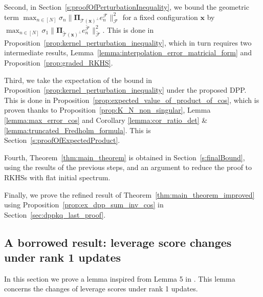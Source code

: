 \documentclass[twoside,11pt]{book}
\numberwithin{theorem}{chapter}
\numberwithin{definition}{chapter}
\numberwithin{proposition}{chapter}
\numberwithin{corollary}{chapter}
\numberwithin{example}{chapter}
\numberwithin{lemma}{chapter}
\numberwithin{assumption}{chapter}
\numberwithin{equation}{chapter}
\numberwithin{figure}{chapter}
\begin{document}

Second, in Section~\ref{s:proofOfPerturbationInequality}, we bound the geometric term $\max_{n \in [N]} \sigma_{n} \|\bm{\Pi}_{\mathcal{T}(\bm{x})^{\perp}} e_{n}^{\mathcal{F}}\|_{\mathcal{F}}^{2}$ for a fixed configuration $\bm{x}$ by $\max_{n \in [N]} \sigma_{1} \|\bm{\Pi}_{\tilde{\mathcal{T}}(\bm{x})^{\perp}} e_{n}^{\tilde{\mathcal{F}}}\|_{\tilde{\mathcal{F}}}^{2}$. This is done in Proposition~\ref{prop:kernel_perturbation_inequality}, which in turn requires two intermediate results, Lemma~\ref{lemma:interpolation_error_matricial_form} and Proposition~\ref{prop:graded_RKHS}.


Third, we take the expectation of the bound in Proposition~\ref{prop:kernel_perturbation_inequality} under the proposed DPP. This is done in Proposition~\ref{prop:expected_value_of_product_of_cos}, which is proven thanks to Proposition~\ref{prop:K_N_non_singular}, Lemma \ref{lemma:max_error_cos} and Corollary \ref{lemma:cor_ratio_det} \& \ref{lemma:truncated_Fredholm_formula}. This is Section~\ref{s:proofOfExpectedProduct}.



Fourth, Theorem~\ref{thm:main_theorem} is obtained in Section~\ref{s:finalBound}, using the results of the previous steps, and an argument to reduce the proof to RKHSs with flat initial spectrum.

Finally, we prove the refined result of Theorem~\ref{thm:main_theorem_improved} using Proposition~\ref{prop:ex_dpp_sum_inv_cos} in Section~\ref{sec:dppkq_last_proof}.  


\subsection{A borrowed result: leverage score changes under rank 1 updates} \label{subsec:lv_score_updates}


In this section we prove a lemma inspired from Lemma 5 in \cite{Coh15}. This lemma concerns the changes of leverage scores under rank 1 updates.
\end{document}
